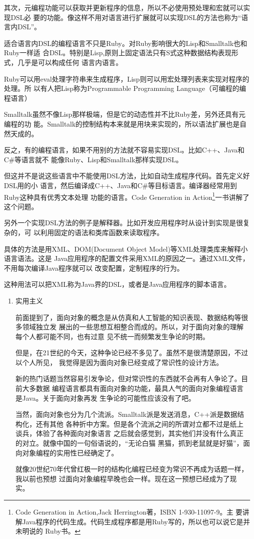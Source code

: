 \documentclass[11pt]{ctexart}
\begin{document}
其次，元编程功能可以获取并更新程序的信息，所以不必使用预处理和宏就可以实现DSL必
要的功能。像这样不用对语言进行扩展就可以实现DSL的方法也称为“语言内DSL”。

适合语言内DSL的编程语言不只是Ruby。对Ruby影响很大的Lisp和Smalltalk也和Ruby一样适
合DSL。特别是Lisp,原则上固定语法只有S式这种数据结构表现形式，几乎是可以构成任何
语言内语言。

Ruby可以用eval处理字符串来生成程序，Lisp则可以用宏处理列表来实现对程序的处理。所
以有人把Lisp称为Programmable Programming Language（可编程的编程语言）

Smalltalk虽然不像Lisp那样极端，但是它的动态性并不比Ruby差，另外还具有元编程的功
能。Smalltalk的控制结构本来就是用块来实现的，所以语法扩展也是自然天成的。

反之，有的编程语言，如果不用别的方法就不容易实现DSL。比如C++、Java和C\#等语言就不
能像Ruby、Lisp和Smalltalk那样实现DSL。

但这并不是说这些语言中不能使用DSL方法，比如自动生成程序代码。首先定义好DSL用的小
语言，然后编译成C++、Java和C\#等目标语言。编译器经常用到Ruby这种具有优秀文本处理
功能的语言。Code Generation in Action\footnote{Code Generation in Action,Jack Herrington著，ISBN 1-930-11097-9。主
要讲解Java程序的代码生成。代码生成程序都是用Ruby写的，所以也可以说它是并未明说的
Ruby书。}一书讲解了这个问题。

另外一个实现DSL方法的例子是解释器。比如开发应用程序时从设计到实现是很复杂的，可
以利用固定的语法和类库函数来读取程序。

具体的方法是用XML、DOM(Document Object Model)等XML处理类库来解释小语言语法。这是
Java应用程序的配置文件采用XML的原因之一。通过XML文件，不用每次编译Java程序就可以
改变配置，定制程序的行为。

这种用法可以把XML称为Java界的DSL，或者是Java应用程序的脚本语言。
\begin{enumerate}
\item 实用主义
\label{sec:org3240bd7}

前面提到了，面向对象的概念是从仿真和人工智能的知识表现、数据结构等很多领域独立发
展出的一些思想互相整合而成的。所以，对于面向对象的理解每个人都可能不同，也有过意
见不统一而频繁发生争论的时期。

但是，在21世纪的今天，这种争论已经不多见了。虽然不是很清楚原因，不过以个人所见，
我觉得是因为面向对象已经变成了常识性的设计方法。

新的热门话题当然容易引发争论，但对常识性的东西就不会再有人争论了。目前大多数据
编程语言都具有面向对象的功能，最具人气的面向对象编程语言是Java。关于面向对象再发
生争论的可能性应该没有了吧。

当然，面向对象也分为几个流派。Smalltalk派是发送消息，C++派是数据结构化，还有其他
各种折中方案。但是各个流派之间的所谓对立都不过是纸上谈兵，体验了各种面向对象语言
之后就会感觉到，其实他们并没有什么真正的对立。就像中国的一句俗语说的，“无论白猫
黑猫，抓到老鼠就是好猫”，面向对象编程的实用性已经确定了。

就像20世纪70年代曾红极一时的结构化编程已经变为常识不再成为话题一样，我以前也预想
过面向对象编程早晚也会一样。现在这一预想已经成为了现实。
\end{enumerate}
\end{document}

